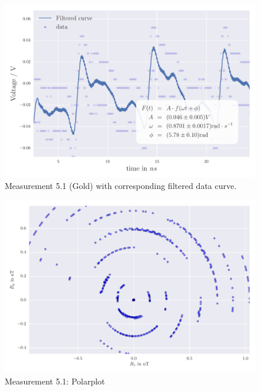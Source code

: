 \begin{figure}[H]
    \centering
    \includegraphics[width=0.7\linewidth]{analysis/figures/fit5_1}
    \caption{Measurement 5.1 (Gold) with corresponding filtered data curve.}
    \label{fig:5_1_plot}
\end{figure}
\begin{figure}[H]
    \centering
    \includegraphics[width=0.7\linewidth]{analysis/figures/polar5_1}
    \caption{Measurement 5.1: Polarplot}
    \label{fig:5_1_polar}
\end{figure}



